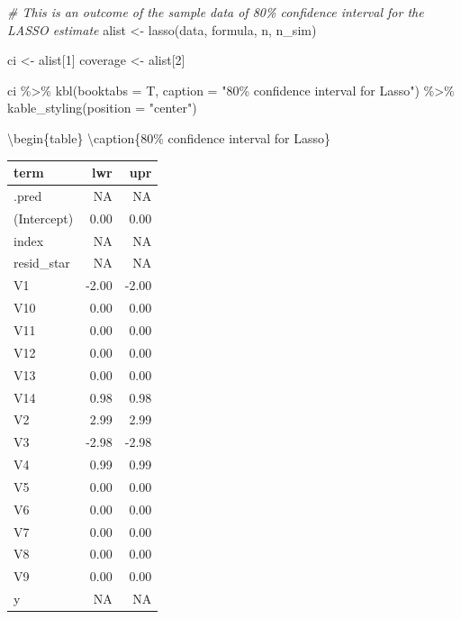 \documentclass[
]{article}
\newenvironment{Shaded}{\begin{snugshade}}{\end{snugshade}}
\newcommand{\AttributeTok}[1]{\textcolor[rgb]{0.77,0.63,0.00}{#1}}
\newcommand{\CommentTok}[1]{\textcolor[rgb]{0.56,0.35,0.01}{\textit{#1}}}
\newcommand{\DecValTok}[1]{\textcolor[rgb]{0.00,0.00,0.81}{#1}}
\newcommand{\FunctionTok}[1]{\textcolor[rgb]{0.00,0.00,0.00}{#1}}
\newcommand{\NormalTok}[1]{#1}
\newcommand{\OtherTok}[1]{\textcolor[rgb]{0.56,0.35,0.01}{#1}}
\newcommand{\SpecialCharTok}[1]{\textcolor[rgb]{0.00,0.00,0.00}{#1}}
\newcommand{\StringTok}[1]{\textcolor[rgb]{0.31,0.60,0.02}{#1}}
\begin{document}
\begin{Shaded}
\begin{Highlighting}[]
\CommentTok{\# This is an outcome of the sample data of 80\% confidence interval  for the LASSO estimate}
\NormalTok{alist }\OtherTok{\textless{}{-}} \FunctionTok{lasso}\NormalTok{(data, formula, n, n\_sim) }

\NormalTok{ci }\OtherTok{\textless{}{-}}\NormalTok{ alist[}\DecValTok{1}\NormalTok{]}
\NormalTok{coverage }\OtherTok{\textless{}{-}}\NormalTok{ alist[}\DecValTok{2}\NormalTok{]}

\NormalTok{ci }\SpecialCharTok{\%\textgreater{}\%}
  \FunctionTok{kbl}\NormalTok{(}\AttributeTok{booktabs =}\NormalTok{ T,}
      \AttributeTok{caption =} \StringTok{"80\% confidence interval for Lasso"}\NormalTok{) }\SpecialCharTok{\%\textgreater{}\%}
  \FunctionTok{kable\_styling}\NormalTok{(}\AttributeTok{position =} \StringTok{"center"}\NormalTok{)}
\end{Highlighting}
\end{Shaded}

\textbackslash begin\{table\}
\textbackslash caption\{\label{tab:unnamed-chunk-24}80\% confidence
interval for Lasso\}

\begin{table}

\centering
\begin{tabular}[t]{lrr}
\toprule
term & lwr & upr\\
\midrule
.pred & NA & NA\\
(Intercept) & 0.00 & 0.00\\
index & NA & NA\\
resid\_star & NA & NA\\
V1 & -2.00 & -2.00\\
\addlinespace
V10 & 0.00 & 0.00\\
V11 & 0.00 & 0.00\\
V12 & 0.00 & 0.00\\
V13 & 0.00 & 0.00\\
V14 & 0.98 & 0.98\\
\addlinespace
V2 & 2.99 & 2.99\\
V3 & -2.98 & -2.98\\
V4 & 0.99 & 0.99\\
V5 & 0.00 & 0.00\\
V6 & 0.00 & 0.00\\
\addlinespace
V7 & 0.00 & 0.00\\
V8 & 0.00 & 0.00\\
V9 & 0.00 & 0.00\\
y & NA & NA\\
\bottomrule
\end{tabular}
\end{table}
\end{document}

